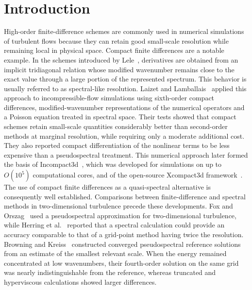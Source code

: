 \documentclass[11pt,a4paper]{article}
\begin{document}
\section{Introduction}
High-order finite-difference schemes are commonly used in numerical simulations of turbulent flows because they can retain good small-scale resolution while remaining local in physical space. Compact finite differences are a notable example. In the schemes introduced by Lele~\cite{lele1992}, derivatives are obtained from an implicit tridiagonal relation whose modified wavenumber remains close to the exact value through a large portion of the represented spectrum. This behavior is usually referred to as spectral-like resolution.
Laizet and Lamballais~\cite{laizet2009} applied this approach to incompressible-flow simulations using sixth-order compact differences, modified-wavenumber representations of the numerical operators and a Poisson equation treated in spectral space. Their tests showed that compact schemes retain small-scale quantities considerably better than second-order methods at marginal resolution, while requiring only a moderate additional cost. They also reported compact differentiation of the nonlinear terms to be less expensive than a pseudospectral treatment. This numerical approach later formed the basis of Incompact3d~\cite{laizet2011,laizet2010}, which was developed for simulations on up to $O(10^5)$ computational cores, and of the open-source Xcompact3d framework~\cite{bartholomew2020}. The use of compact finite differences as a quasi-spectral alternative is consequently well established.
Comparisons between finite-difference and spectral methods in two-dimensional turbulence precede these developments. Fox and Orszag~\cite{fox1973} used a pseudospectral approximation for two-dimensional turbulence, while Herring et al.~\cite{herring1974} reported that a spectral calculation could provide an accuracy comparable to that of a grid-point method having twice the resolution. Browning and Kreiss~\cite{browning1989} constructed converged pseudospectral reference solutions from an estimate of the smallest relevant scale. When the energy remained concentrated at low wavenumbers, their fourth-order solution on the same grid was nearly indistinguishable from the reference, whereas truncated and hyperviscous calculations showed larger differences.
\end{document}
